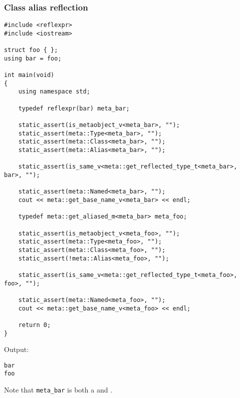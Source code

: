 \subsubsection{Class alias reflection}

\begin{verbatim}
#include <reflexpr>
#include <iostream>

struct foo { };
using bar = foo;

int main(void)
{
	using namespace std;

	typedef reflexpr(bar) meta_bar;

	static_assert(is_metaobject_v<meta_bar>, "");
	static_assert(meta::Type<meta_bar>, "");
	static_assert(meta::Class<meta_bar>, "");
	static_assert(meta::Alias<meta_bar>, "");

	static_assert(is_same_v<meta::get_reflected_type_t<meta_bar>, bar>, "");

	static_assert(meta::Named<meta_bar>, "");
	cout << meta::get_base_name_v<meta_bar> << endl;

	typedef meta::get_aliased_m<meta_bar> meta_foo;

	static_assert(is_metaobject_v<meta_foo>, "");
	static_assert(meta::Type<meta_foo>, "");
	static_assert(meta::Class<meta_foo>, "");
	static_assert(!meta::Alias<meta_foo>, "");

	static_assert(is_same_v<meta::get_reflected_type_t<meta_foo>, foo>, "");

	static_assert(meta::Named<meta_foo>, "");
	cout << meta::get_base_name_v<meta_foo> << endl;

	return 0;
}
\end{verbatim}

Output:

\begin{verbatim}
bar
foo
\end{verbatim}

Note that \texttt{meta\_bar} is both a  and .

